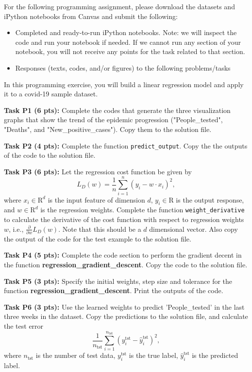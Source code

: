 \documentclass[12pt]{article}
\begin{document}
For the following programming assignment, please download the datasets and iPython notebooks from Canvas and submit the following:
\begin{itemize}
    \item Completed and ready-to-run iPython notebooks. Note: we will inspect the code and run your notebook if needed. If we cannot run any section of your notebook, you will not receive any points for the task related to that section. 
    \item Responses (texts, codes, and/or figures) to the following problems/tasks
\end{itemize}


In this programming exercise, you will build a linear regression model and apply it to a covid-19 sample dataset. 


\textbf{Task P1 (6 pts):} Complete the codes that generate the three visualization graphs that show the trend of the epidemic progression ("People\_tested", "Deaths", and "New\_positive\_cases"). Copy them to the solution file.

\textbf{Task P2 (4 pts):} Complete the function \texttt{predict\_output}. Copy the the outputs of the code to the solution file.

\textbf{Task P3 (6 pts):} Let the regression cost function be given by
$$L_D(w) = \frac{1}{n}\sum_{i=1}^n (y_i-w\cdot x_i)^2,$$
where $x_i\in \mathrm{R}^d$ is the input feature of dimension $d$, $y_i\in\mathrm{R}$ is the output response, and $w\in\mathrm{R}^d$ is the regression weights. Complete the function \texttt{weight\_derivative} to calculate the derivative of the cost function with respect to regression weights $w$, i.e., $\frac{\partial}{\partial w}L_D(w)$. Note that this should be a $d$ dimensional vector. Also copy the output of the code for the test example to the solution file.

\textbf{Task P4  (5 pts):}  Complete the code section to perform the gradient decent in the function \textbf{regression\_gradient\_descent}. Copy the code to the solution file.


\textbf{Task P5 (3 pts):} Specify the initial weights, step size and tolerance for the function \textbf{regression\_gradient\_descent}. Print the outputs of the code.


\textbf{Task P6 (3 pts):} Use the learned weights to predict 'People\_tested' in the last three weeks in the dataset. Copy the predictions to the solution file, and calculate the test error
$$\frac{1}{n_{\mathrm{tst}}}\sum_{i=1}^{n_{\mathrm{tst}}} (y_i^{\mathrm{tst}}-\hat{y}_i^{\mathrm{tst}})^2,$$
where $n_{\mathrm{tst}}$ is the number of test data, $y_i^{\mathrm{tst}}$ is the true label, $\hat{y}_i^{\mathrm{tst}}$ is the predicted label.
\end{document}
